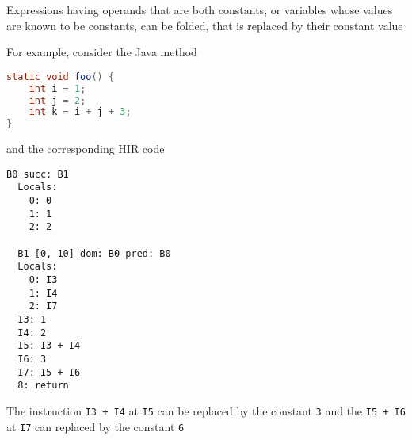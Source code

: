 \documentclass[8pt,a4paper,compress]{beamer}
\begin{document}
\begin{frame}[fragile]
\pause

Expressions having operands that are both constants, or variables whose values are known to be constants, can be folded, that is replaced by their constant value

\pause
\bigskip

For example, consider the Java method

\begin{lstlisting}[language=Java]
static void foo() {
    int i = 1;
    int j = 2;
    int k = i + j + 3;
}
\end{lstlisting}

and the corresponding HIR code

\begin{lstlisting}[language={}]
  B0 succ: B1
  Locals:
    0: 0
    1: 1
    2: 2

  B1 [0, 10] dom: B0 pred: B0
  Locals:
    0: I3
    1: I4
    2: I7
  I3: 1
  I4: 2
  I5: I3 + I4
  I6: 3
  I7: I5 + I6
  8: return
\end{lstlisting}

\pause
\bigskip

The instruction \lstinline{I3 + I4} at \lstinline{I5} can be replaced by the constant \lstinline{3} and the \lstinline{I5 + I6} at \lstinline{I7} can replaced by the constant \lstinline{6}
\end{frame}
\end{document}
